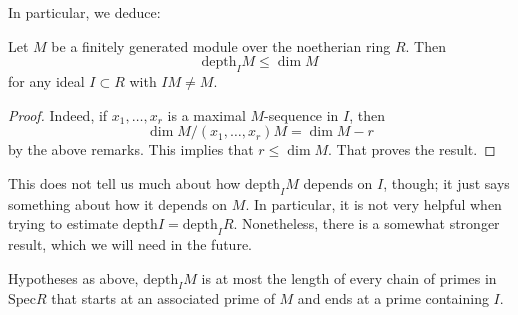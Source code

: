 In particular, we deduce:
\begin{proposition} 
Let $M$ be a finitely generated module over the noetherian ring $R$. Then
\[ \mathrm{depth}_I M \leq \dim M  \]
for any ideal $I \subset R$ with $IM \neq M$.
\end{proposition} 
\begin{proof} 
Indeed, if $x_1, \dots, x_r$ is a maximal $M$-sequence in $I$, then 
\[ \dim M/(x_1 , \dots, x_r) M = \dim M - r  \]
by the above remarks. 
This implies that $r \leq \dim M$. That proves the result. 
\end{proof} 

This does not tell us much about how $\mathrm{depth}_I M$ depends on $I$, though; it
just says something about how it depends on $M$. In particular, it is not very
helpful when trying to estimate $\mathrm{depth} I = \mathrm{depth}_I R$.
Nonetheless, there is a somewhat stronger result, which we will need in the
future.

\begin{proposition} 
Hypotheses as above, $\mathrm{depth}_I M$ is at most the length of every  chain
of primes in $\mathrm{Spec} R$ that starts at an associated prime of $M$ and
ends at a prime containing $I$.
\end{proposition} 


